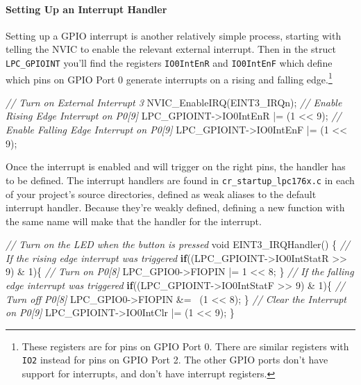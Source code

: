 \documentclass[]{article}
\newenvironment{Shaded}{\begin{snugshade}}{\end{snugshade}}
\newcommand{\KeywordTok}[1]{\textcolor[rgb]{0.13,0.29,0.53}{\textbf{{#1}}}}
\newcommand{\DataTypeTok}[1]{\textcolor[rgb]{0.13,0.29,0.53}{{#1}}}
\newcommand{\DecValTok}[1]{\textcolor[rgb]{0.00,0.00,0.81}{{#1}}}
\newcommand{\CommentTok}[1]{\textcolor[rgb]{0.56,0.35,0.01}{\textit{{#1}}}}
\newcommand{\NormalTok}[1]{{#1}}
\begin{document}
\paragraph{Setting Up an Interrupt Handler}

Setting up a GPIO interrupt is another relatively simple process,
starting with telling the NVIC to enable the relevant external
interrupt. Then in the struct \texttt{LPC\_GPIOINT} you'll find the
registers \texttt{IO0IntEnR} and \texttt{IO0IntEnF} which define which
pins on GPIO Port 0 generate interrupts on a rising and falling
edge.\footnote{These registers are for pins on GPIO Port 0. There are
  similar registers with \texttt{IO2} instead for pins on GPIO Port 2.
  The other GPIO ports don't have support for interrupts, and don't have
  interrupt registers.}

\begin{Shaded}
\begin{Highlighting}[]
    \CommentTok{// Turn on External Interrupt 3}
    \NormalTok{NVIC_EnableIRQ(EINT3_IRQn);}
    \CommentTok{// Enable Rising Edge Interrupt on P0[9]}
    \NormalTok{LPC_GPIOINT->IO0IntEnR |= (}\DecValTok{1} \NormalTok{<< }\DecValTok{9}\NormalTok{);}
    \CommentTok{// Enable Falling Edge Interrupt on P0[9]}
    \NormalTok{LPC_GPIOINT->IO0IntEnF |= (}\DecValTok{1} \NormalTok{<< }\DecValTok{9}\NormalTok{);}
\end{Highlighting}
\end{Shaded}

Once the interrupt is enabled and will trigger on the right pins, the
handler has to be defined. The interrupt handlers are found in
\texttt{cr\_startup\_lpc176x.c} in each of your project's source
directories, defined as weak aliases to the default interrupt handler.
Because they're weakly defined, defining a new function with the same
name will make that the handler for the interrupt.

\begin{Shaded}
\begin{Highlighting}[]
    \CommentTok{// Turn on the LED when the button is pressed}
    \DataTypeTok{void} \NormalTok{EINT3_IRQHandler() \{}
        \CommentTok{// If the rising edge interrupt was triggered}
        \KeywordTok{if}\NormalTok{((LPC_GPIOINT->IO0IntStatR >> }\DecValTok{9}\NormalTok{) & }\DecValTok{1}\NormalTok{)\{}
            \CommentTok{// Turn on P0[8]}
            \NormalTok{LPC_GPIO0->FIOPIN |= }\DecValTok{1} \NormalTok{<< }\DecValTok{8}\NormalTok{;      }
        \NormalTok{\}}
        \CommentTok{// If the falling edge interrupt was triggered}
        \KeywordTok{if}\NormalTok{((LPC_GPIOINT->IO0IntStatF >> }\DecValTok{9}\NormalTok{) & }\DecValTok{1}\NormalTok{)\{}
            \CommentTok{// Turn off P0[8]}
            \NormalTok{LPC_GPIO0->FIOPIN &= ~(}\DecValTok{1} \NormalTok{<< }\DecValTok{8}\NormalTok{);      }
        \NormalTok{\}}
        \CommentTok{// Clear the Interrupt on P0[9]}
        \NormalTok{LPC_GPIOINT->IO0IntClr |= (}\DecValTok{1} \NormalTok{<< }\DecValTok{9}\NormalTok{);}
    \NormalTok{\}}
\end{Highlighting}
\end{Shaded}
\end{document}
